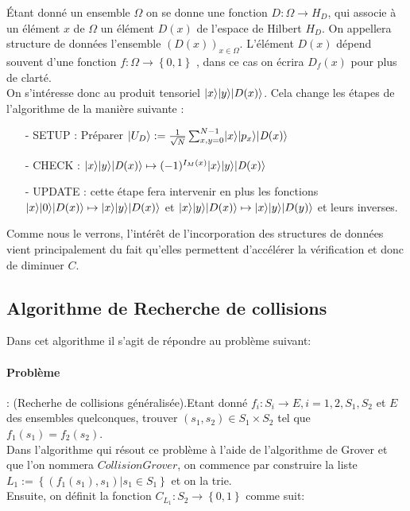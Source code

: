 \documentclass[12pt,openany]{report}
\DeclarePairedDelimiter\ket{\lvert}{\rangle}
\begin{document}
Étant donné un ensemble $\Omega$ on se donne une fonction $D : \Omega \rightarrow H_D$, qui
associe à un élément $x$ de $\Omega $ un élément  $D(x)$ de l’espace de Hilbert $H_D$. On
appellera structure de données l’ensemble $(D(x))_{x\in \Omega} $.
L’élément $ D(x) $ dépend souvent d’une fonction $f : \Omega  \rightarrow \left\lbrace  0, 1 \right\rbrace $ , dans ce cas on écrira $D_f (x)$ pour plus de clarté.\\
On s’intéresse donc au produit tensoriel $\ket{x} \ket{y}\ket{D(x)}$. Cela change les étapes
de l’algorithme de la manière suivante :
\begin{itemize}
\item[-] SETUP : Préparer $\ket{U_D} := \frac{1}{\sqrt{N}}\sum_{x,y=0}^{N-1} \ket{x} \ket{p_x}\ket{\mathit{D}(x)}$
\item[-]CHECK : $ \ket{x} \ket{y} \ket{ \mathit{D}(x)} \mapsto (-1)^{I_M(x)}\ket{x} \ket{y}\ket{\mathit{D}(x)} $
\item[-] UPDATE : cette étape fera intervenir en plus les fonctions $\ket{x}\ket{0}\ket{D(x)} \mapsto 
\ket{x} \ket{y}\ket{D(x)}$ et $\ket{x} \ket{y}\ket{D(x)} \mapsto \ket{x} \ket{y}\ket{D(y)}$ et leurs inverses.

\end{itemize}
Comme nous le verrons, l’intérêt de l’incorporation des structures de données
vient principalement du fait qu’elles permettent d’accélérer la vérification et
donc de diminuer $C$.\cite{Ghazal}

\subsection{Algorithme de Recherche de collisions}

Dans cet algorithme il s'agit de répondre au problème suivant:
\paragraph{Problème}: (Recherhe de collisions généralisée).Etant donné $f_i: S_i \rightarrow E,i=1,2,S_1,S_2    $ et $E$ des ensembles quelconques, trouver $(s_1,s_2)\in S_1 \times S_2 $ tel que $f_1(s_1)=f_2(s_2)$.\cite{Ghazal}\\
Dans l’algorithme qui résout ce problème à l’aide de l’algorithme de Grover
et que l’on nommera $CollisionGrover$, on commence par construire la liste\\
$L_1:=\left\lbrace (f_1(s_1),s_1)|s_1 \in S_1 \right\rbrace   $ et on la trie.\\
Ensuite, on définit la fonction $ C_{L_1}: S_2 \rightarrow \left\lbrace 0,1 \right\rbrace  $ comme suit:
\end{document}
